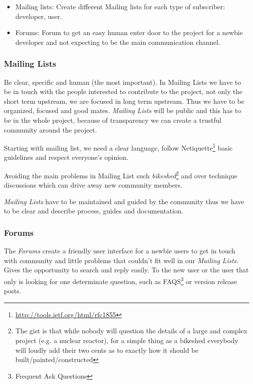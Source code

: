 \documentclass[11pt]{scrartcl}
\begin{document}
\begin{itemize}
	\item Mailing lists: Create different Mailing lists for each type of subscriber: developer, user. 
	\item Forums: Forum to get an easy human enter door to the project for a newbie developer and not expecting to be the main communication channel.
\end{itemize}

\subsubsection{Mailing Lists}
\label{sub:mailing-lists}

\par Be clear, specific and human (the most important). In Mailing Lists we have to be in touch with the people interested to contribute to the project, not only the short term upstream, we are focused in long term upstream. Thus we have to be organized, focused and good mates. \emph{Mailing Lists} will be public and this has to be in the whole project, because of transparency we can create a trustful community around the project.

\par Starting with mailing list, we need a clear language, follow Netiquette\footnote{\url{http://tools.ietf.org/html/rfc1855}} basic guidelines and respect everyone’s opinion. 

\par Avoiding the main problems in Mailing List such \emph{bikeshed}\footnote{The gist is that while nobody will question the details of a large and complex project (e.g. a nuclear reactor), for a simple thing as a bikeshed everybody will loudly add their two cents as to exactly how it should be built/painted/constructed} and over technique discussions which can drive away new community members.

\par \emph{Mailing Lists} have to be maintained and guided by the community thus we have to be clear and describe process, guides and documentation.

\subsubsection{Forums}
\label{sub:forums}

\par The \emph{Forums} create a friendly user interface for a newbie users to get in touch with community and little problems that couldn't fit well in our \emph{Mailing Lists}. Gives the opportunity to search and reply easily. To the new user or the user that only is looking for one determinate question, such as FAQS\footnote{Frequent Ask Questions} or version release posts.
\end{document}
